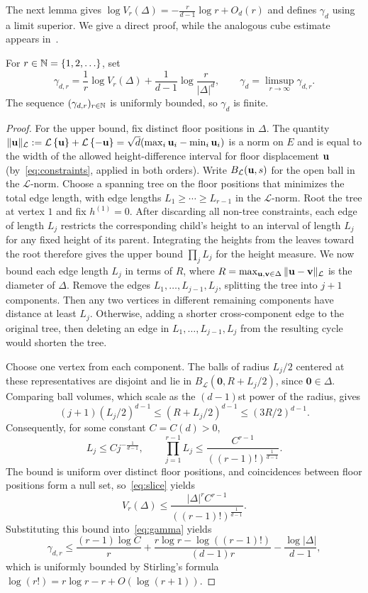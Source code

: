 \documentclass[11pt,letterpaper]{article}
\begin{document}
The next lemma gives $\log V_r(\Delta)=-\frac r{d-1}\log r+O_d(r)$ and defines $\gamma_d$ using a limit superior. We give a direct proof, while the analogous cube estimate appears in~\cite{GP}.
\begin{lemma}\label{lem:constant}
      For $r\in\mathbb N=\{1,2,\ldots\}$, set
      \begin{equation}\label{eq:gamma}
            \gamma_{d,r}=\frac1r\log V_r(\Delta)+\frac1{d-1}\log\frac r{|\Delta|^d}, \qquad \gamma_d=\limsup_{r\to\infty}\gamma_{d,r}.
      \end{equation}
      The sequence $(\gamma_{d,r})_{r\in\mathbb N}$ is uniformly bounded, so $\gamma_d$ is finite.
\end{lemma}
\begin{proof}
      For the upper bound, fix distinct floor positions in $\Delta$. The quantity $\|\mathbf u\|_{\mathcal L}:=\mathcal L\left\{\mathbf u\right\}+\mathcal L\left\{-\mathbf u\right\}=\sqrt d(\max_i\mathbf u_i-\min_i\mathbf u_i)$ is a norm on $E$ and is equal to the width of the allowed height-difference interval for floor displacement $\mathbf u$ (by~\eqref{eq:constraints}, applied in both orders). Write $B_{\mathcal L}(\mathbf u,s)$ for the open ball in the ${\mathcal L}$-norm. Choose a spanning tree on the floor positions that minimizes the total edge length, with edge lengths $L_1\ge\cdots\ge L_{r-1}$ in the ${\mathcal L}$-norm.
      Root the tree at vertex $1$ and fix $h^{(1)}=0$. After discarding all non-tree constraints, each edge of length $L_j$ restricts the corresponding child's height to an interval of length $L_j$ for any fixed height of its parent. Integrating the heights from the leaves toward the root therefore gives the upper bound $\prod_jL_j$ for the height measure.
      We now bound each edge length $L_j$ in terms of $R$, where $R=\max_{\mathbf u,\mathbf v\in\Delta}\|\mathbf u-\mathbf v\|_{\mathcal L}$ is the diameter of $\Delta$.
      Remove the edges $L_1,\ldots,L_{j-1},L_{j}$, splitting the tree into $j+1$ components. Then any two vertices in different remaining components have distance at least $L_{j}$. Otherwise, adding a shorter cross-component edge to the original tree, then deleting an edge in $L_1,\ldots,L_{j-1},L_{j}$ from the resulting cycle would shorten the tree.

      Choose one vertex from each component. The balls of radius $L_{j}/2$ centered at these representatives are disjoint and lie in $B_{\mathcal L}(\mathbf0,R+L_{j}/2)$, since $\mathbf0\in\Delta$. Comparing ball volumes, which scale as the $(d-1)$st power of the radius, gives
      \[
            (j+1)\left(L_j/2\right)^{d-1} \le\left(R+L_j/2\right)^{d-1} \le\left(3R/2\right)^{d-1}.
      \]
      Consequently, for some constant $C=C(d)>0$,
      \[
            L_j\le Cj^{-\frac1{d-1}},\qquad \prod_{j=1}^{r-1}L_j\le \frac{C^{r-1}}{((r-1)!)^{\frac1{d-1}}}.
      \]
      The bound is uniform over distinct floor positions, and coincidences between floor positions form a null set, so~\eqref{eq:slice} yields
      \[
            V_r(\Delta) \le\frac{|\Delta|^rC^{r-1}}{((r-1)!)^{\frac1{d-1}}}.
      \]
      Substituting this bound into~\eqref{eq:gamma} yields
      \[
            \gamma_{d,r}\le \frac{(r-1)\log C}{r} +\frac{r\log r-\log((r-1)!)}{(d-1)r} -\frac{\log|\Delta|}{d-1},
      \]
      which is uniformly bounded by Stirling's formula $\log(r!)=r\log r-r+O(\log(r+1))$.


\end{proof}
\end{document}
